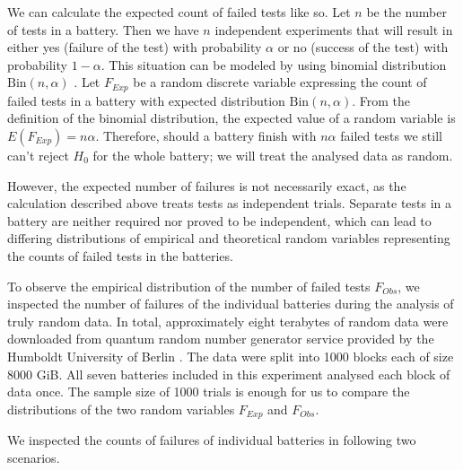 \documentclass[
	digital,    %
	oneside,
	color,
	11pt,
	nocover,
	notable,
	nolof,
	nolot,
]{fithesis3}
\theoremstyle{definition}
\theoremstyle{remark}
\begin{document}
We can calculate the expected count of failed tests like so. Let $n$ be the number of tests in a battery. Then we have $n$ independent experiments that will result in either yes (failure of the test) with probability $\alpha$ or no (success of the test) with probability $1-\alpha$. This situation can be modeled by using binomial distribution $\text{Bin}(n, \alpha)$ \cite[p.~245]{stat-handbook}. Let $F_{Exp}$ be a random discrete variable expressing the count of failed tests in a battery with expected distribution $\text{Bin}(n, \alpha)$. From the definition of the binomial distribution, the expected value of a random variable is $E(F_{Exp}) = n\alpha$. Therefore, should a battery finish with $n\alpha$ failed tests we still can't reject $H_0$ for the whole battery; we will treat the analysed data as random.

However, the expected number of failures is not necessarily exact, as the calculation described above treats tests as independent trials. Separate tests in a battery are neither required nor proved to be independent, which can lead to differing distributions of empirical and theoretical random variables representing the counts of failed tests in the batteries.

To observe the empirical distribution of the number of failed tests $F_{Obs}$, we inspected the number of failures of the individual batteries during the analysis of truly random data. In total, approximately eight terabytes of random data were downloaded from quantum random number generator service provided by the Humboldt University of Berlin \cite{qrng-service-germany}. The data were split into 1000 blocks each of size 8000 GiB. All seven batteries included in this experiment analysed each block of data once. The sample size of 1000 trials is enough for us to compare the distributions of the two random variables $F_{Exp}$ and $F_{Obs}$.

We inspected the counts of failures of individual batteries in following two scenarios.
\end{document}
